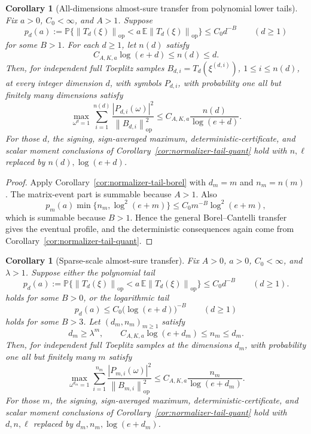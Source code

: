 \documentclass[11pt]{amsart}
\numberwithin{equation}{section}
\newtheorem{corollary}[theorem]{Corollary}
\theoremstyle{definition}
\theoremstyle{remark}
\newcommand{\op}{\mathrm{op}}
\newcommand{\Prob}{\mathbb P}
\newcommand{\Exp}{\mathbb E}
\newcommand{\norm}[1]{\left\lVert #1\right\rVert}
\newcommand{\abs}[1]{\left\lvert #1\right\rvert}
\begin{document}
\begin{corollary}[All-dimensions almost-sure transfer from polynomial lower tails]
\label{cor:normalizer-tail-borel-all-dim-poly}
Fix \(a>0\), \(C_0<\infty\), and \(A>1\).  Suppose
\[
  p_d(a):=\Prob\{\norm{T_d(\xi)}_{\op}<a\,\Exp\norm{T_d(\xi)}_{\op}\}
  \le C_0d^{-B}
  \qquad(d\ge1)
\]
for some \(B>1\).  For each \(d\ge1\), let \(n(d)\) satisfy
\[
  C_{A,K,a}\log(e+d)\le n(d)\le d.
\]
Then, for independent full Toeplitz samples \(B_{d,i}=T_d(\xi^{(d,i)})\),
\(1\le i\le n(d)\), at every integer dimension \(d\), with symbols
\(P_{d,i}\), with probability one all but finitely many dimensions satisfy
\[
  \max_{\omega^d=1}
  \sum_{i=1}^{n(d)}
  \frac{\abs{P_{d,i}(\omega)}^2}{\norm{B_{d,i}}_{\op}^2}
  \le C_{A,K,a}\frac{n(d)}{\log(e+d)}.
\]
For those \(d\), the signing, sign-averaged maximum, deterministic-certificate,
and scalar moment conclusions of Corollary~\ref{cor:normalizer-tail-quant} hold
with \(n,\ell\) replaced by \(n(d),\log(e+d)\).
\end{corollary}

\begin{proof}
Apply Corollary~\ref{cor:normalizer-tail-borel} with \(d_m=m\) and
\(n_m=n(m)\).  The matrix-event part is summable because \(A>1\).  Also
\[
  p_m(a)\min\{n_m,\log^2(e+m)\}
  \le C_0m^{-B}\log^2(e+m),
\]
which is summable because \(B>1\).  Hence the general Borel--Cantelli transfer
gives the eventual profile, and the deterministic consequences again come from
Corollary~\ref{cor:normalizer-tail-quant}.
\end{proof}

\begin{corollary}[Sparse-scale almost-sure transfer]
\label{cor:normalizer-tail-borel-sparse}
Fix \(A>0\), \(a>0\), \(C_0<\infty\), and \(\lambda>1\).  Suppose either the
polynomial tail
\[
  p_d(a):=\Prob\{\norm{T_d(\xi)}_{\op}<a\,\Exp\norm{T_d(\xi)}_{\op}\}
  \le C_0d^{-B}
  \qquad(d\ge1).
\]
holds for some \(B>0\), or the logarithmic tail
\[
  p_d(a)\le C_0\bigl(\log(e+d)\bigr)^{-B}
  \qquad(d\ge1)
\]
holds for some \(B>3\).
Let \((d_m,n_m)_{m\ge1}\) satisfy
\[
  d_m\ge \lambda^m,\qquad
  C_{A,K,a}\log(e+d_m)\le n_m\le d_m .
\]
Then, for independent full Toeplitz samples at the dimensions \(d_m\), with
probability one all but finitely many \(m\) satisfy
\[
  \max_{\omega^{d_m}=1}
  \sum_{i=1}^{n_m}
  \frac{\abs{P_{m,i}(\omega)}^2}{\norm{B_{m,i}}_{\op}^2}
  \le C_{A,K,a}\frac{n_m}{\log(e+d_m)}.
\]
For those \(m\), the signing, sign-averaged maximum, deterministic-certificate,
and scalar moment conclusions of Corollary~\ref{cor:normalizer-tail-quant} hold
with \(d,n,\ell\) replaced by \(d_m,n_m,\log(e+d_m)\).
\end{corollary}
\end{document}

